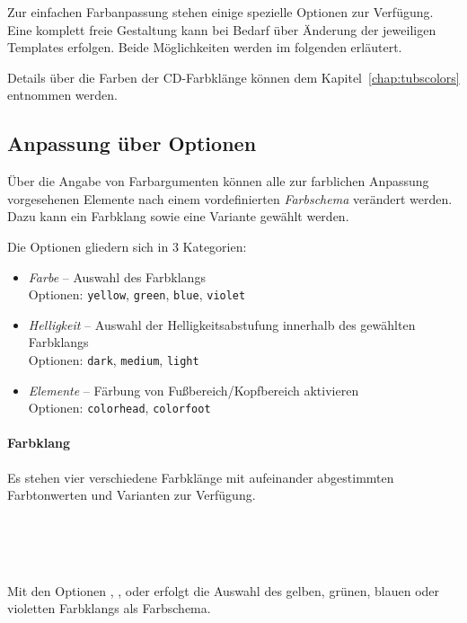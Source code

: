 Zur einfachen Farbanpassung stehen einige spezielle Optionen zur Verfügung.
Eine komplett freie Gestaltung kann bei Bedarf über Änderung der
jeweiligen Templates erfolgen. Beide Möglichkeiten werden im folgenden
erläutert.

Details über die Farben der CD-Farbklänge können dem
Kapitel~\ref{chap:tubscolors} entnommen werden.

\subsection{Anpassung über Optionen}

Über die Angabe von Farbargumenten können alle zur farblichen Anpassung
vorgesehenen Elemente nach einem vordefinierten \emph{Farbschema}
verändert werden.
Dazu kann ein Farbklang sowie eine Variante gewählt werden.

Die Optionen gliedern sich in 3 Kategorien:
\begin{itemize}
  \item \emph{Farbe} -- Auswahl des Farbklangs\\
    Optionen: \texttt{yellow}, \texttt{green}, \texttt{blue}, \texttt{violet}
  \item \emph{Helligkeit} -- Auswahl der Helligkeitsabstufung
    innerhalb des gewählten Farbklangs\\
    Optionen: \texttt{dark}, \texttt{medium}, \texttt{light}
  \item \emph{Elemente} -- Färbung von Fußbereich/Kopfbereich aktivieren\\
    Optionen: \texttt{colorhead}, \texttt{colorfoot}
\end{itemize}


\paragraph{Farbklang}
Es stehen vier verschiedene Farbklänge mit aufeinander abgestimmten Farbtonwerten
und Varianten zur Verfügung.

\begin{Declaration}
  \\
  \\
  \\
\end{Declaration}

Mit den Optionen , , 
oder  erfolgt die Auswahl des
gelben, grünen, blauen oder violetten Farbklangs als Farbschema.


